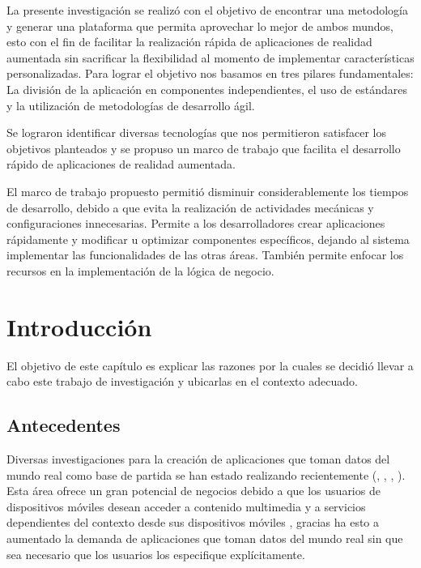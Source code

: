 \documentclass[12pt,a4paper,spanish,openany]{book}
\begin{document}
La presente investigación se realizó con el objetivo de encontrar una
metodología y generar una plataforma que permita aprovechar lo mejor
de ambos mundos, esto con el fin de facilitar la realización  rápida de
aplicaciones de realidad aumentada sin sacrificar la flexibilidad al momento de
implementar características personalizadas. Para lograr el objetivo nos basamos
en tres pilares fundamentales: La división de la aplicación en componentes
independientes, el uso de estándares y la utilización de metodologías de
desarrollo ágil.

Se lograron identificar diversas tecnologías que nos permitieron satisfacer los
objetivos planteados y se propuso un marco de trabajo que facilita el desarrollo
rápido de aplicaciones de realidad aumentada. 

El marco de trabajo propuesto permitió disminuir considerablemente los tiempos
de desarrollo, debido a que evita la realización de actividades mecánicas y
configuraciones innecesarias. Permite a los desarrolladores crear aplicaciones
rápidamente y modificar u optimizar componentes específicos, dejando al sistema implementar las funcionalidades de las otras áreas. También permite
enfocar los recursos en la implementación de la lógica de negocio.




\tableofcontents
\singlespacing


\chapter{Introducción}
El objetivo de este capítulo es explicar las razones por la cuales
se decidió llevar a cabo este trabajo de investigación y ubicarlas en
el contexto adecuado.

\section{Antecedentes}

Diversas investigaciones para la creación de aplicaciones que toman datos del
mundo real como base de partida se han estado realizando recientemente
(\cite{Said:2010:PTC:1869652.1869665},
\cite{Taherkordi:2009:SLA:1554233.1554244},
\cite{Rahmani:2010:TCA:1869652.1869662}, \cite{Fujii:2009:SCD:1516533.1516536}).
Esta área ofrece un gran potencial de negocios debido a que los usuarios de
dispositivos móviles desean acceder a contenido multimedia y a servicios
dependientes del contexto desde sus dispositivos móviles
\cite{Davidyuk:2004:CMM:1052380.1052410}, gracias ha esto a aumentado la demanda
de aplicaciones que toman datos del mundo real sin que sea necesario que los
usuarios los especifique explícitamente. 
\end{document}
